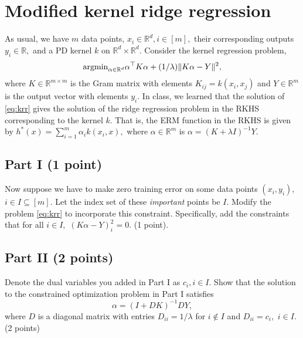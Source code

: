 \documentclass[12pt]{article}
\begin{document}
\section{Modified kernel ridge regression}
As usual, we have $m$ data points, $x_i \in \mathbb{R}^d, i \in [m],$ their corresponding outputs $y_i \in \mathbb{R},$ and a PD kernel $k$ on $\mathbb{R}^d\times \mathbb{R}^d.$ 
Consider the kernel regression problem,
\begin{align}
\label{eq:krr}
    {\rm arg min}_{\alpha \in \mathbb{R}^d} \alpha^\top K \alpha + (1/\lambda) \|K\alpha - Y\|^2,
\end{align}
where $K \in \mathbb{R}^{m\times m}$ is the Gram matrix with elements $K_{ij}= k(x_i, x_j)$ and $Y \in \mathbb{R}^m$ is the output vector with elements $y_i.$ In class, we learned that the solution of \eqref{eq:krr} gives the solution of the ridge regression problem in the RKHS corresponding to the kernel $k.$ That is, the ERM function in the RKHS is given by $h^*(x) = \sum_{i=1}^m \alpha_i k(x_i,x),$ where $\alpha \in \mathbb{R}^m$ is $\alpha = (K + \lambda I)^{-1} Y.$
\subsection*{Part I (1 point)}
Now suppose we have to make zero training error on some data points $(x_i, y_i),$ $i \in I \subseteq [m].$ Let the index set of these \emph{important} points be $I.$ Modify the problem \eqref{eq:krr} to incorporate this constraint. Specifically, add the constraints that for all $i \in I,$ $(K\alpha - Y)_i^2 = 0.$ (1 point).

\subsection*{Part II (2 points)}
Denote the dual variables you added in Part I as $c_i, i \in I.$
Show that the solution to the constrained optimization problem in Part I satisfies
$$\alpha = (I + D K)^{-1} D Y,$$ where $D$ is a diagonal matrix with entries $D_{ii} = 1/\lambda$ for $i \notin I$ and $D_{ii} = c_i,$ $i \in I.$ (2 points)
\end{document}
